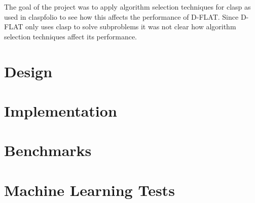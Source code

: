 The goal of the project was to apply algorithm selection techniques for clasp as used in claspfolio to see how this affects the performance of D-FLAT. Since D-FLAT only uses clasp to solve subproblems it was not clear how algorithm selection techniques affect its performance.
\section{Design}

\section{Implementation}
\label{sec:impl}

\section{Benchmarks}\label{sec:benchmarks}

\section{Machine Learning Tests}
\label{sec:ml}







